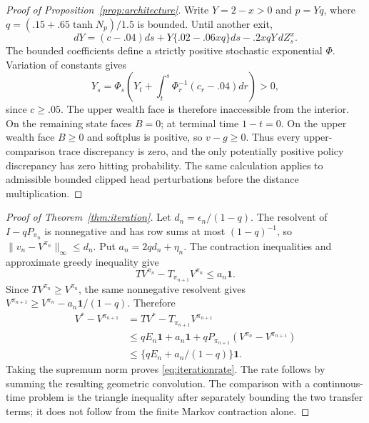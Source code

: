\begin{proof}[Proof of Proposition~\ref{prop:architecture}]
Write $Y=2-x>0$ and $p=Yq$, where $q=(.15+.65\tanh N_p)/1.5$ is bounded. Until another exit,
\[
 dY=(c-.04)ds+Y\{.02-.06xq\}ds-.2xqY\,dZ^x_s.
\]
The bounded coefficients define a strictly positive stochastic exponential $\Phi$. Variation of constants gives
\[
 Y_s=\Phi_s\left(Y_t+\int_t^s\Phi_r^{-1}(c_r-.04)dr\right)>0,
\]
since $c\geq.05$. The upper wealth face is therefore inaccessible from the interior. On the remaining state faces $B=0$; at terminal time $1-t=0$. On the upper wealth face $B\geq0$ and softplus is positive, so $v-g\geq0$. Thus every upper-comparison trace discrepancy is zero, and the only potentially positive policy discrepancy has zero hitting probability. The same calculation applies to admissible bounded clipped head perturbations before the distance multiplication.
\end{proof}

\begin{proof}[Proof of Theorem~\ref{thm:iteration}]
Let $d_n=\epsilon_n/(1-q)$. The resolvent of $I-qP_{\pi_n}$ is nonnegative and has row sums at most $(1-q)^{-1}$, so $\|v_n-V^{\pi_n}\|_\infty\leq d_n$. Put $a_n=2qd_n+\eta_n$. The contraction inequalities and approximate greedy inequality give
\[
 TV^{\pi_n}-T_{\pi_{n+1}}V^{\pi_n}\leq a_n\mathbf1.
\]
Since $TV^{\pi_n}\geq V^{\pi_n}$, the same nonnegative resolvent gives $V^{\pi_{n+1}}\geq V^{\pi_n}-a_n\mathbf1/(1-q)$. Therefore
\begin{align*}
 V^*-V^{\pi_{n+1}}
 &=TV^*-T_{\pi_{n+1}}V^{\pi_{n+1}}\\
 &\leq qE_n\mathbf1+a_n\mathbf1+qP_{\pi_{n+1}}(V^{\pi_n}-V^{\pi_{n+1}})\\
 &\leq\{qE_n+a_n/(1-q)\}\mathbf1.
\end{align*}
Taking the supremum norm proves \eqref{eq:iterationrate}. The rate follows by summing the resulting geometric convolution. The comparison with a continuous-time problem is the triangle inequality after separately bounding the two transfer terms; it does not follow from the finite Markov contraction alone.
\end{proof}

